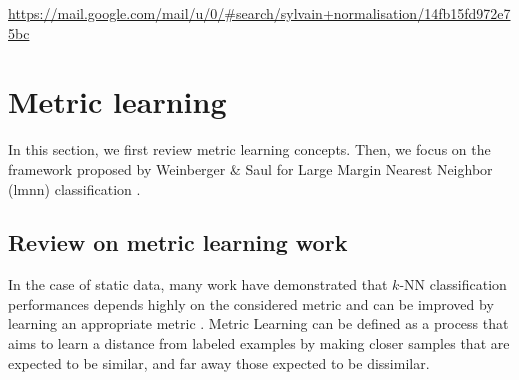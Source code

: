 \url{https://mail.google.com/mail/u/0/#search/sylvain+normalisation/14fb15fd972e75bc}

\section{Metric learning}
In this section, we first review metric learning concepts. Then, we focus on the framework proposed by Weinberger \& Saul for Large Margin Nearest Neighbor ({\sc lmnn}) classification \cite{Weinberger2009}.

\subsection{Review on metric learning work}
In the case of static data, many work have demonstrated that $k$-NN classification performances depends highly on the considered metric and can be improved by learning an appropriate metric \cite{Shental2002,Goldberger2004,Chopra2005}. Metric Learning can be defined as a process that aims to learn a distance from labeled examples by making closer samples that are expected to be similar, and far away those expected to be dissimilar.

